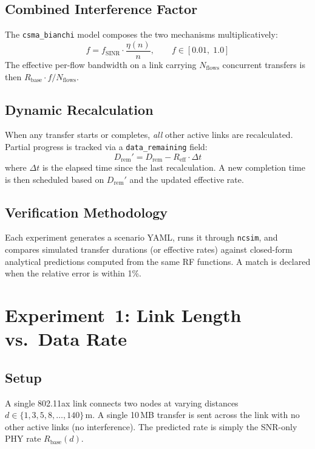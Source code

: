 \documentclass[11pt,a4paper]{article}
\newcommand{\ncsim}{\texttt{ncsim}}
\begin{document}
\subsection{Combined Interference Factor}

The \texttt{csma\_bianchi} model composes the two mechanisms multiplicatively:
\begin{equation}
    f = f_{\text{SINR}} \cdot \frac{\eta(n)}{n}, \qquad f \in [0.01, \; 1.0]
\end{equation}
The effective per-flow bandwidth on a link carrying $N_{\text{flows}}$ concurrent transfers is then $R_{\text{base}} \cdot f / N_{\text{flows}}$.

\subsection{Dynamic Recalculation}

When any transfer starts or completes, \emph{all} other active links are recalculated. Partial progress is tracked via a \texttt{data\_remaining} field:
\begin{equation}
    D_{\text{rem}}' = D_{\text{rem}} - R_{\text{eff}} \cdot \Delta t
\end{equation}
where $\Delta t$ is the elapsed time since the last recalculation. A new completion time is then scheduled based on $D_{\text{rem}}'$ and the updated effective rate.

\subsection{Verification Methodology}

Each experiment generates a scenario YAML, runs it through \ncsim{}, and compares simulated transfer durations (or effective rates) against closed-form analytical predictions computed from the same RF functions. A match is declared when the relative error is within 1\%.

\section{Experiment~1: Link Length vs.\ Data Rate}
\label{sec:exp1}

\subsection{Setup}
A single 802.11ax link connects two nodes at varying distances $d \in \{1, 3, 5, 8, \ldots, 140\}\,$m. A single 10\,MB transfer is sent across the link with no other active links (no interference). The predicted rate is simply the SNR-only PHY rate $R_{\text{base}}(d)$.
\end{document}
